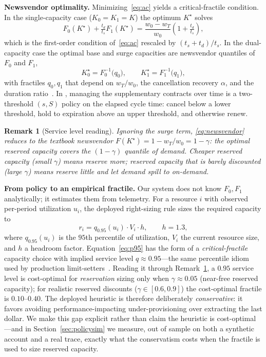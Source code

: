 \documentclass[10pt,journal]{IEEEtran}
\newtheorem{remark}{Remark}
\begin{document}
\textbf{Newsvendor optimality.}
Minimizing~\eqref{eq:ac} yields a critical-fractile condition. In the
single-capacity case ($K_0=K_1=K$) the optimum $K^\star$
solves~\cite[Prop.~1]{chen2024capacity}
\begin{equation}
F_0(K^\star) + \tfrac{t_d}{t_s}F_1(K^\star)
= \frac{w_0-w_T}{w_0}\left(1+\tfrac{t_d}{t_s}\right),
\label{eq:newsvendor}
\end{equation}
which is the first-order condition of~\eqref{eq:ac} rescaled by
$(t_s+t_d)/t_s$. In the dual-capacity case the optimal base and surge
capacities are newsvendor quantiles of $F_0$ and $F_1$,
\begin{equation}
K_0^\star = F_0^{-1}\!\big(q_0\big),\qquad
K_1^\star = F_1^{-1}\!\big(q_1\big),
\label{eq:fractiles}
\end{equation}
with fractiles $q_0,q_1$ that depend on $w_T/w_0$, the cancellation recovery
$\alpha$, and the duration ratio~\cite[Thm.~1]{chen2024capacity}. In
\cite{chen2024capacity}, managing the supplementary contracts over time is a
two-threshold $(s,S)$ policy on the elapsed cycle time: cancel below a lower
threshold, hold to expiration above an upper threshold, and otherwise renew.

\begin{remark}[Service level reading]\label{rem:service}
Ignoring the surge term, \eqref{eq:newsvendor} reduces to the textbook
newsvendor $F(K^\star)=1-w_T/w_0=1-\gamma$: the optimal reserved capacity
covers the $(1-\gamma)$ quantile of demand. Cheaper reserved capacity (small
$\gamma$) means reserve more; reserved capacity that is barely discounted
(large $\gamma$) means reserve little and let demand spill to on-demand.
\end{remark}

\textbf{From policy to an empirical fractile.}
Our system does not know $F_0,F_1$ analytically; it estimates them from
telemetry. For a resource $i$ with observed per-period utilization $u_i$,
the deployed right-sizing rule sizes the required capacity to
\begin{equation}
r_i = q_{0.95}(u_i)\cdot V_i \cdot h,\qquad h=1.3,
\label{eq:p95}
\end{equation}
where $q_{0.95}(u_i)$ is the $95$th percentile of utilization, $V_i$ the
current resource size, and $h$ a headroom factor. Equation~\eqref{eq:p95}
has the form of a \emph{critical-fractile} capacity choice with implied
service level $q\!\approx\!0.95$---the same percentile idiom used by
production limit-setters~\cite{rzadca2020autopilot,cortez2017resource}.
Reading it through Remark~\ref{rem:service}, a $0.95$ service level is
cost-optimal for \emph{reservation} sizing only when
$\gamma\!\approx\!0.05$ (near-free reserved capacity); for realistic
reserved discounts ($\gamma\in[0.6,0.9]$) the cost-optimal fractile is
$0.10$--$0.40$. The deployed heuristic is therefore deliberately
\emph{conservative}: it favors avoiding performance-impacting
under-provisioning over extracting the last dollar. We make this gap
explicit rather than claim the heuristic is cost-optimal---and in
Section~\ref{sec:policysim} we measure, out of sample on both a synthetic
account and a real trace, exactly what the conservatism costs when the
fractile is used to size reserved capacity.
\end{document}
